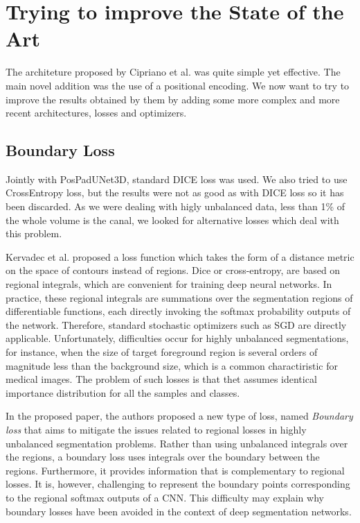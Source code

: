 
\chapter{Trying to improve the State of the Art}

\label{chp:refwork}

\def\:{\hskip0pt} %
The architeture proposed by Cipriano et al. was quite simple yet effective. The
main novel addition was the use of a positional encoding. We now want to try to
improve the results obtained by them by adding some more complex
and more recent architectures, losses and optimizers.

\section{Boundary Loss}
Jointly with PosPadUNet3D, standard DICE loss was used. We also tried to use
CrossEntropy loss, but the results were not as good as with DICE loss so it has
been discarded. As we were dealing with higly unbalanced data, less than 1\% of
the whole volume is the canal, we looked for alternative losses which deal with
this problem.

Kervadec et al. proposed a loss function which takes the form of a distance
metric on the space of contours instead of regions. Dice or cross-entropy, are
based on regional integrals, which are convenient for training deep neural
networks. In practice, these regional integrals are summations over the
segmentation regions of differentiable functions, each directly invoking the
softmax probability outputs of the network. Therefore, standard stochastic
optimizers such as SGD are directly applicable. Unfortunately, difficulties
occur for highly unbalanced segmentations, for instance, when the size of target
foreground region is several orders of magnitude less than the background size,
which is a common charactiristic for medical images. The problem of such losses
is that thet assumes identical importance distribution for all the samples and
classes.

In the proposed paper, the authors proposed a new type of loss, named
\emph{Boundary loss} that aims to mitigate the issues related to regional losses
in highly unbalanced segmentation problems. Rather than using unbalanced
integrals over the regions, a boundary loss uses integrals over the boundary
between the regions. Furthermore, it provides information that is complementary
to regional losses. It is, however, challenging to represent the boundary points
corresponding to the regional softmax outputs of a CNN. This difficulty may
explain why boundary losses have been avoided in the context of deep
segmentation networks.

